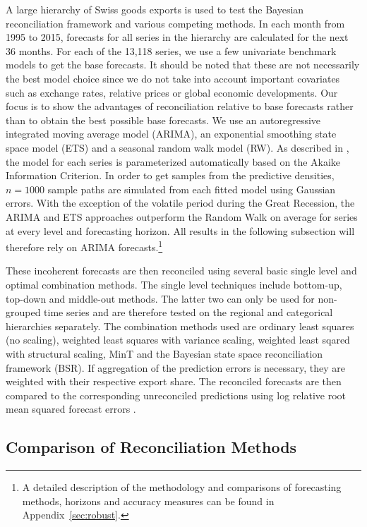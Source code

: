 \documentclass[a4paper,fleqn,11pt]{article}
\begin{document}
A large hierarchy of Swiss goods exports is used to test the Bayesian reconciliation framework and various competing methods. In each month from 1995 to 2015, forecasts for all series in the hierarchy are calculated for the next 36 months. For each of the 13,118 series, we use a few univariate benchmark models to get the base forecasts. It should be noted that these are not necessarily the best model choice since we do not take into account important covariates such as exchange rates, relative prices or global economic developments. Our focus is to show the advantages of reconciliation relative to base forecasts rather than to obtain the best possible base forecasts. We use an autoregressive integrated moving average model (ARIMA), an exponential smoothing state space model (ETS) and a seasonal random walk model (RW). As described in \cite{Hyndman2008}, the model for each series is parameterized automatically based on the Akaike Information Criterion. In order to get samples from the predictive densities, $n = 1000$ sample paths are simulated from each fitted model using Gaussian errors. With the exception of the volatile period during the Great Recession, the ARIMA and ETS approaches outperform the Random Walk on average for series at every level and forecasting horizon. All results in the following subsection will therefore rely on ARIMA forecasts.\footnote{A detailed description of the methodology and comparisons of forecasting methods, horizons and accuracy measures can be found in Appendix~\ref{sec:robust}.}

These incoherent forecasts are then reconciled using several basic single level and optimal combination methods. The single level techniques include bottom-up, top-down and middle-out methods. The latter two can only be used for non-grouped time series and are therefore tested on the regional and categorical hierarchies separately. The combination methods used are ordinary least squares (no scaling), weighted least squares with variance scaling, weighted least sqared with structural scaling, MinT and the Bayesian state space reconciliation framework (BSR). If aggregation of the prediction errors is necessary, they are weighted with their respective export share. The reconciled forecasts are then compared to the corresponding unreconciled predictions using log relative root mean squared forecast errors \citep{Hyndman2006}.


\subsection{Comparison of Reconciliation Methods}\label{sec:comp}
\end{document}
